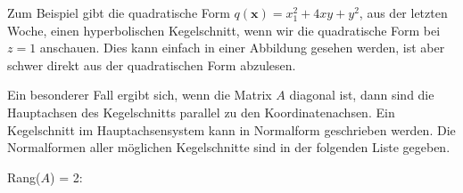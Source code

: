 \vspace{\baselineskip}

Zum Beispiel gibt die quadratische Form \( q(\mathbf{x}) = x_1^2 + 4xy + y^2 \), aus der letzten Woche, einen hyperbolischen Kegelschnitt, wenn wir die quadratische Form bei \( z = 1 \) anschauen. Dies kann einfach in einer Abbildung gesehen werden, ist aber schwer direkt aus der quadratischen Form abzulesen. 

\vspace{2\baselineskip}

\begin{figure}[h]
    \centering
\end{figure}

\newpage

Ein besonderer Fall ergibt sich, wenn die Matrix \( A \) diagonal ist, dann sind die Hauptachsen des Kegelschnitts parallel zu den Koordinatenachsen. Ein Kegelschnitt im Hauptachsensystem kann in Normalform geschrieben werden. Die Normalformen aller möglichen Kegelschnitte sind in der folgenden Liste gegeben.

\vspace{\baselineskip}

Rang(\( A \)) = 2:

